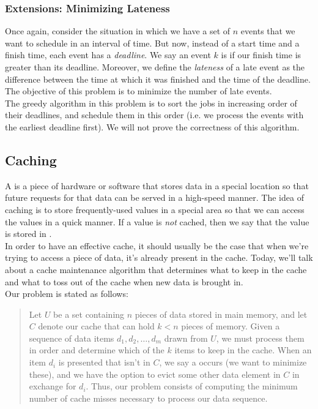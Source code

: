 \subsubsection{Extensions: Minimizing Lateness}

Once again, consider the situation in which we have a set of $n$ events that we want to schedule in an interval of time. But now, instead of a start time and a finish time, each event has a \textit{deadline}. We say an event $k$ is  if our finish time is greater than its deadline. Moreover, we define the \textit{lateness} of a late event as the difference between the time at which it was finished and the time of the deadline. The objective of this problem is to minimize the number of late events. \\

The greedy algorithm in this problem is to sort the jobs in increasing order of their deadlines, and schedule them in this order (i.e. we process the events with the earliest deadline first). We will not prove the correctness of this algorithm.



\subsection{Caching}

A  is a piece of hardware or software that stores data in a special location so that future requests for that data can be served in a high-speed manner. The idea of caching is to store frequently-used values in a special area so that we can access the values in a quick manner. If a value is \textit{not} cached, then we say that the value is stored in . \\

In order to have an effective cache, it should usually be the case that when we're trying to access a piece of data, it's already present in the cache. Today, we'll talk about a cache maintenance algorithm that determines what to keep in the cache and what to toss out of the cache when new data is brought in. \\

Our problem is stated as follows: \\

\begin{quote}
    Let $U$ be a set containing $n$ pieces of data stored in main memory, and let $C$ denote our cache that can hold $k < n$ pieces of memory. Given a sequence of data items $d_1, d_2, \ldots, d_m$ drawn from $U$, we must process them in order and determine which of the $k$ items to keep in the cache. When an item $d_i$ is presented that isn't in $C$, we say a  occurs (we want to minimize these), and we have the option to evict some other data element in $C$ in exchange for $d_i$. Thus, our problem consists of computing the minimum number of cache misses necessary to process our data sequence.
\end{quote}


